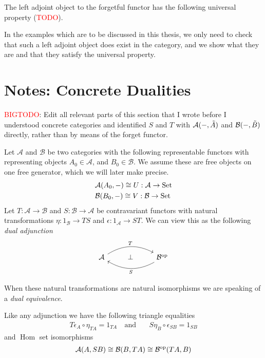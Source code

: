 \documentclass[12pt,a4paper]{article}
\DeclareMathOperator{\Hom}{Hom}
\DeclareMathOperator{\Set}{Set}
\DeclareMathOperator{\op}{op}
\def\HomA{\ensuremath\mathcal{A}}
\def\HomB{\ensuremath\mathcal{B}}
\def\t{\ensuremath\tilde}
\begin{document}
The left adjoint object to the forgetful functor has the following universal property (\textcolor{red}{TODO}).

In the  examples which are to be discussed in this thesis, we only need to check that such a left adjoint object does exist in the category, and we show what they are and that they satisfy the universal property.
\section{Notes: Concrete Dualities}	


\textcolor{red}{BIGTODO}:
Edit all relevant parts of this section that I wrote before I understood concrete categories and identified $S$ and $T$ with $\HomA(-,\t A)$ and $\HomB(-,\t B)$ directly, rather than by means of the forget functor.

Let $\mathcal{A}$ and $\mathcal{B}$ be two categories with the following representable functors with representing objects $A_0 \in \mathcal{A}$, and $B_0 \in \mathcal{B}$. We assume these are free objects on one free generator, which we will later make precise. 
\begin{align*}
	&\HomA(A_0, -) \cong U: \mathcal{A} \to \Set\\
	&\HomB(B_0, -) \cong V: \mathcal{B} \to \Set\\
\end{align*}
Let $T: \mathcal{A} \to \mathcal{B}$ and $S: \mathcal{B} \to \mathcal{A}$ be contravariant functors with natural transformations $\eta: 1_\mathcal{B} \to TS$ and $\epsilon :  1_\mathcal{A} \to ST$. We can view this as the following \emph{dual adjunction}
\[\begin{tikzcd}
	{\mathcal{A}} & \bot & {\mathcal{B}^{\op}}
	\arrow["T", bend left, from=1-1, to=1-3]
	\arrow["S", bend left, from=1-3, to=1-1]
\end{tikzcd}\]

When these natural transformations are natural isomorphisms we are speaking of a \emph{dual equivalence}. 

Like any adjunction we have the following triangle equalities \begin{align*}
	&T{\epsilon_A} \circ \eta_{TA} = 1_{TA} \ &\text{and}& \ &  S{\eta_B} \circ \epsilon_{SB} = 1_{SB}&
\end{align*}
and $\Hom$ set isomorphisms \begin{align*}
	\HomA(A, SB) \cong \HomB(B, TA) \cong \HomB^{\op}(TA,B)
\end{align*}
\end{document}
